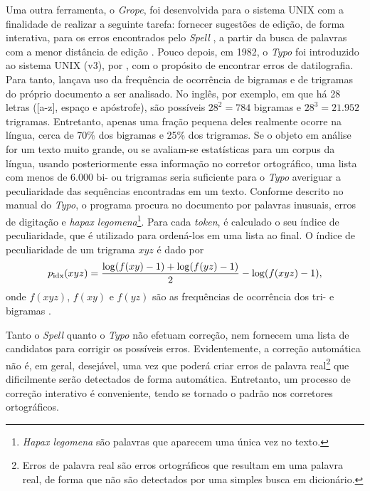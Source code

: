 \documentclass{textolivre}
\begin{document}
Uma outra ferramenta, o \textit{Grope}, foi desenvolvida para o sistema UNIX com a finalidade
de realizar a seguinte tarefa: fornecer
sugestões de edição, de forma interativa, 
para os erros encontrados pelo \textit{Spell} , a partir
da busca de palavras com a menor
distância de edição . Pouco
depois, em 1982, o \textit{Typo} foi introduzido ao
sistema UNIX (v3), %
por \textcite{morris1975} \cite{mcmahon1978,mahoney}, 
com o propósito de encontrar erros de datilografia. 
Para tanto, lançava uso da frequência de ocorrência de bigramas e de trigramas do próprio documento a ser analisado. No inglês, por
exemplo, em que há 28 letras ([a-z], espaço e apóstrofe), são possíveis
$28^2=784$ bigramas e $28^3=21.952$ trigramas. Entretanto, 
apenas uma fração pequena deles realmente ocorre na língua, cerca de 70\% dos bigramas
e 25\% dos trigramas. Se o objeto em análise for
um texto muito grande, ou se avaliam-se
estatísticas para um corpus da língua,
usando posteriormente essa informação no corretor ortográfico,
uma lista com menos de $6.000$ bi- ou trigramas 
seria suficiente para o \textit{Typo} averiguar a
peculiaridade das sequências encontradas em um texto.
Conforme descrito no manual do \textit{Typo}, o programa procura no documento por palavras inusuais, erros de digitação
e \textit{hapax legomena}\footnote{\textit{Hapax legomena} são palavras que aparecem uma única vez no texto.}.
Para cada \textit{token}, é calculado o seu índice de peculiaridade, que é utilizado para ordená-los
em uma lista ao final. O índice de peculiaridade de um trigrama $xyz$ é dado por
\begin{equation}\label{eq-pec-idx}
p_{\textmd{idx}}(xyz) = \frac{\log(f(xy)-1) + \log(f(yz)-1)}{2} - \log(f(xyz) - 1) ,
\end{equation}
onde $f(xyz)$, $f(xy)$ e $f(yz)$ são as frequências de ocorrência dos tri- e bigramas \cite{morris1975,peterson80}.

Tanto o \textit{Spell} quanto o \textit{Typo} não efetuam correção, nem fornecem uma lista 
de candidatos para corrigir os possíveis erros. Evidentemente, a correção automática não
é, em geral, desejável, uma vez que poderá criar erros de palavra real\footnote{
Erros de palavra real são erros ortográficos que resultam em
uma palavra real, de forma que não são detectados
por uma simples busca em dicionário.} 
que dificilmente serão detectados de forma automática. Entretanto, um processo de correção
interativo é conveniente, tendo se tornado o padrão nos corretores ortográficos.
\end{document}
